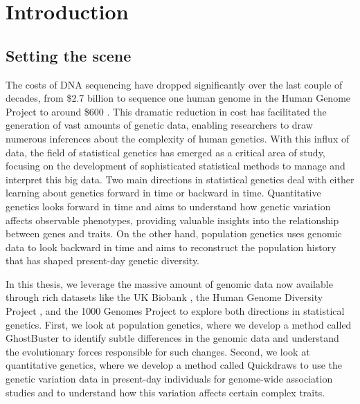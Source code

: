 \chapter{\label{ch:1-intro}Introduction} 

\minitoc

\section{Setting the scene}

The costs of DNA sequencing have dropped significantly over the last couple of decades, from \$2.7 billion to sequence one human genome in the Human Genome Project \cite{Collins2003} to around \$600 \cite{Wetterstrand2022}. This dramatic reduction in cost has facilitated the generation of vast amounts of genetic data, enabling researchers to draw numerous inferences about the complexity of human genetics. With this influx of data, the field of statistical genetics has emerged as a critical area of study, focusing on the development of sophisticated statistical methods to manage and interpret this big data. Two main directions in statistical genetics deal with either learning about genetics forward in time or backward in time. Quantitative genetics looks forward in time and aims to understand how genetic variation affects observable phenotypes, providing valuable insights into the relationship between genes and traits. On the other hand, population genetics uses genomic data to look backward in time and aims to reconstruct the population history that has shaped present-day genetic diversity.

In this thesis, we leverage the massive amount of genomic data now available through rich datasets like the UK Biobank \cite{bycroft2018uk}, the Human Genome Diversity Project \cite{cann2002human}, and the 1000 Genomes Project \cite{10002015global} to explore both directions in statistical genetics. First, we look at population genetics, where we develop a method called GhostBuster to identify subtle differences in the genomic data and understand the evolutionary forces responsible for such changes. Second, we look at quantitative genetics, where we develop a method called Quickdraws to use the genetic variation data in present-day individuals for genome-wide association studies and to understand how this variation affects certain complex traits.

